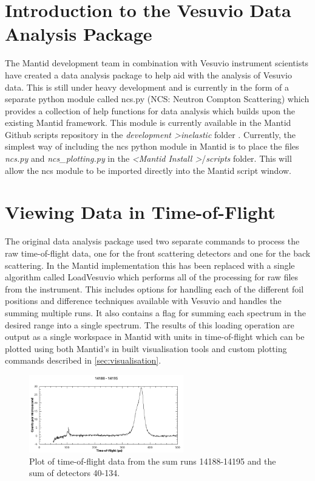 \documentclass[paper=a4, fontsize=11pt]{scrartcl}	%
\numberwithin{equation}{section}															%
\numberwithin{figure}{section}																%
\numberwithin{table}{section}
\begin{document}
\section{Introduction to the Vesuvio Data Analysis Package}
\label{sec:intro-data-analysis}
The Mantid development team in combination with Vesuvio instrument scientists have created a data analysis package to help aid with the analysis of Vesuvio data. This is still under heavy development and is currently in the form of a separate python module called ncs.py (NCS: Neutron Compton Scattering) which provides a collection of help functions for data analysis which builds upon the existing Mantid framework. This module is currently available in the Mantid Github scripts repository in the \textit{development \textgreater  inelastic} folder \cite{mantidgithubncs}. Currently, the simplest way of including the ncs python module in Mantid is to place the files \textit{ncs.py} and \textit{ncs\_plotting.py} in the \textit{ \textless Mantid Install \textgreater }/\textit{scripts} folder. This will allow the ncs module to be imported directly into the Mantid script window.

\section{Viewing Data in Time-of-Flight}
\label{sec:viewtof}
The original data analysis package \cite{mayers2010user} used two separate commands to process the raw time-of-flight data, one for the front scattering detectors and one for the back scattering. In the Mantid implementation this has been replaced with a single algorithm called LoadVesuvio which performs all of the processing for raw files from the instrument. This includes options for handling each of the different foil positions and difference techniques available with Vesuvio \citep{schooneveld2006foil, mayers2004vesuvio} and handles the summing multiple runs. It also contains a flag for summing each spectrum in the desired range into a single spectrum. The results of this loading operation are output as a single workspace in Mantid with units in time-of-flight which can be plotted using both Mantid's in built visualisation tools and custom plotting commands described in \ref{sec:visualisation}.

\begin{figure}[H]
\centering
\includegraphics[width=0.6\textwidth]{img/tof-spectrum.png}
\caption{Plot of time-of-flight data from the sum runs 14188-14195 and the sum of detectors 40-134.}
\label{fig:tof-spectrum}
\end{figure}
\end{document}

